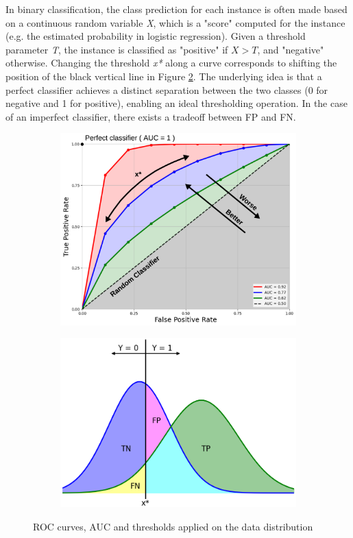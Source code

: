 In binary classification, the class prediction for each instance is often made based on a continuous random variable \textit{X}, which is a "score" computed for the instance (e.g. the estimated probability in logistic regression). 
Given a threshold parameter \textit{T}, the instance is classified as "positive" if $X > T$, and "negative" otherwise. 
Changing the threshold \textit{x*} along a curve corresponds to shifting the position of the black vertical line in Figure \ref{fig:PNDistribution}. 
The underlying idea is that a perfect classifier achieves a distinct separation between the two classes (0 for negative and 1 for positive), enabling an ideal thresholding operation.
In the case of an imperfect classifier, there exists a tradeoff between FP and FN.
\begin{figure}[H]
  \centering
  \begin{subfigure}{0.73\linewidth}
    \includegraphics[width=\linewidth]{graphics/ROC_AUC.png}
    \caption{}
    \label{fig:ROC_AUC}
  \end{subfigure}
  \begin{subfigure}{0.65\linewidth}
    \includegraphics[width=\linewidth]{graphics/PN_Distribution_Thresholded.png}
    \caption{}
    \label{fig:PNDistribution}
  \end{subfigure}
  \caption{ROC curves, AUC and thresholds applied on the data distribution}
  \label{fig:ROC}
\end{figure}
